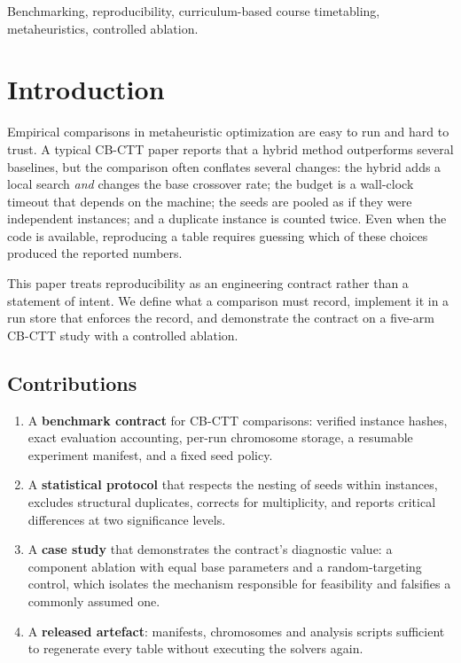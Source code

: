 \documentclass[journal]{IEEEtran}
\begin{document}
\begin{IEEEkeywords}
Benchmarking, reproducibility, curriculum-based course timetabling, metaheuristics, controlled ablation.
\end{IEEEkeywords}

\section{Introduction}
Empirical comparisons in metaheuristic optimization are easy to run and hard to trust. A typical CB-CTT paper reports that a hybrid method outperforms several baselines, but the comparison often conflates several changes: the hybrid adds a local search \emph{and} changes the base crossover rate; the budget is a wall-clock timeout that depends on the machine; the seeds are pooled as if they were independent instances; and a duplicate instance is counted twice. Even when the code is available, reproducing a table requires guessing which of these choices produced the reported numbers.

This paper treats reproducibility as an engineering contract rather than a statement of intent. We define what a comparison must record, implement it in a run store that enforces the record, and demonstrate the contract on a five-arm CB-CTT study with a controlled ablation.

\subsection{Contributions}
\begin{enumerate}
    \item A \textbf{benchmark contract} for CB-CTT comparisons: verified instance hashes, exact evaluation accounting, per-run chromosome storage, a resumable experiment manifest, and a fixed seed policy.
    \item A \textbf{statistical protocol} that respects the nesting of seeds within instances, excludes structural duplicates, corrects for multiplicity, and reports critical differences at two significance levels.
    \item A \textbf{case study} that demonstrates the contract's diagnostic value: a component ablation with equal base parameters and a random-targeting control, which isolates the mechanism responsible for feasibility and falsifies a commonly assumed one.
    \item A \textbf{released artefact}: manifests, chromosomes and analysis scripts sufficient to regenerate every table without executing the solvers again.
\end{enumerate}
\end{document}
